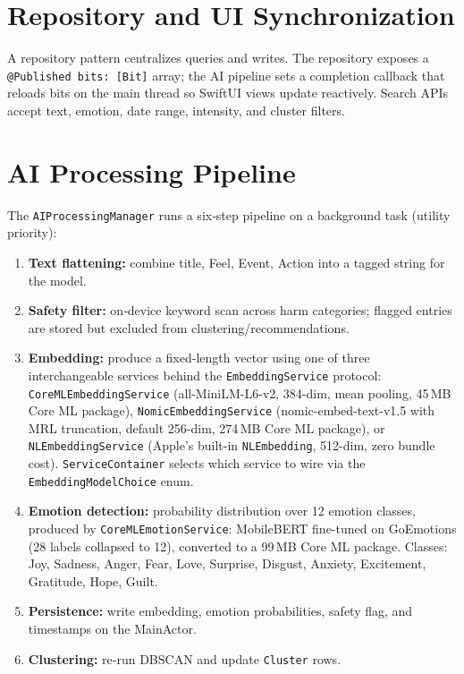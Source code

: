 \section{Repository and UI Synchronization}
A repository pattern centralizes queries and writes. The repository exposes a \texttt{@Published bits: [Bit]} array; the AI pipeline sets a completion callback that reloads bits on the main thread so SwiftUI views update reactively. Search APIs accept text, emotion, date range, intensity, and cluster filters.

\section{AI Processing Pipeline}
The \texttt{AIProcessingManager} runs a six‑step pipeline on a background task (utility priority):

\begin{enumerate}
  \item \textbf{Text flattening:} combine title, Feel, Event, Action into a tagged string for the model.
  \item \textbf{Safety filter:} on‑device keyword scan across harm categories; flagged entries are stored but excluded from clustering/recommendations.
  \item \textbf{Embedding:} produce a fixed-length vector using one of three interchangeable services behind the \texttt{EmbeddingService} protocol: \\ \texttt{CoreMLEmbeddingService} (all-MiniLM-L6-v2, 384-dim, mean pooling, 45\,MB Core ML package),
  \newline\texttt{NomicEmbeddingService} (nomic-embed-text-v1.5 with MRL truncation, default 256-dim, 274\,MB Core ML package), or \texttt{NLEmbeddingService} (Apple's built-in \texttt{NLEmbedding}, 512-dim, zero bundle cost). \texttt{ServiceContainer} selects which service to wire via the \texttt{EmbeddingModelChoice} enum.
  \item \textbf{Emotion detection:} probability distribution over 12 emotion classes, produced by \texttt{CoreMLEmotionService}: MobileBERT fine-tuned on GoEmotions (28 labels collapsed to 12), converted to a 99\,MB Core ML package. Classes: Joy, Sadness, Anger, Fear, Love, Surprise, Disgust, Anxiety, Excitement, Gratitude, Hope, Guilt.
  \item \textbf{Persistence:} write embedding, emotion probabilities, safety flag, and timestamps on the MainActor.
  \item \textbf{Clustering:} re‑run DBSCAN and update \texttt{Cluster} rows.
\end{enumerate}


